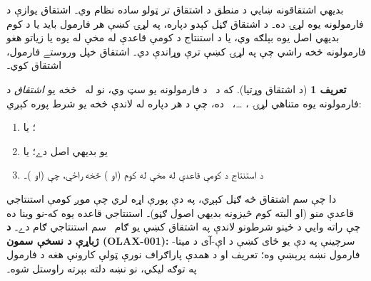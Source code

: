 \documentclass[12pt,a4paper,oneside]{report}
\newcommand{\olfileid}[3]{\gdef\pspart{#1}\gdef\pschapter{#2}\gdef\pssection{#3}}
\gdef\pspart{#2}\gdef\pschapter{#3}\gdef\pssection{}%
\theoremstyle{definition}
\newtheorem{defn}[thm]{تعريف}
\newenvironment{explain}{}{}
\begin{document}
\label{olpseg:OLP-0112-B008:start}
%


\label{olpseg:OLP-0112-B008:end}

\label{olpseg:OLP-0112-B010:start}
%


\label{olpseg:OLP-0112-B010:end}

\label{olpseg:OLP-0112-B013:start}
%


\label{olpseg:OLP-0112-B013:end}

\label{olpseg:OLP-0112-B016:start}
%


\label{olpseg:OLP-0112-B016:end}

\label{olpseg:OLP-0113-B004:start}
\olfileid{fol}{axd}{rul}
\label{olpseg:OLP-0113-B004:end}

\label{olpseg:OLP-0113-B005:start}
\label{olpseg:OLP-0113-B005:end}

\label{olpseg:OLP-0113-B006:start}
\begin{explain}
  بديهي اشتقاقونه ښايي د منطق د اشتقاق تر ټولو ساده
  نظام وي۔ اشتقاق يوازې د فارمولونه يوه لړۍ ده۔ د
  اشتقاق ګڼل کېدو دپاره، په لړۍ کښې هر فارمول بايد
  يا د کوم بديهي اصل يوه بېلګه وي، يا د استنتاج د کومې قاعدې له مخې
  له يوه يا زياتو هغو فارمولونه څخه راشي چې په لړۍ کښې ترې وړاندې
  دي۔ اشتقاق خپل وروستے فارمول، اشتقاق کوي۔
\end{explain}
\label{olpseg:OLP-0113-B006:end}

\label{olpseg:OLP-0113-B007:start}
\begin{defn}[د اشتقاق وړتيا]
که \LR{$\Gamma$} د~ د فارمولونه يو سټ وي، نو له~\LR{$\Gamma$}
څخه يو \emph{اشتقاق} د فارمولونه يوه متناهي لړۍ
، \dots،~ ده، چې د هر  دپاره له لاندې څخه
يو شرط پوره کېږي:
\begin{enumerate}
\item {}؛ يا
\item {} يو بديهي اصل دے؛ يا
\item {} د استنتاج د کومې قاعدې له مخې له کوم  (او
  ) څخه راځي، چې  (او )۔
\end{enumerate}
\end{defn}
\label{olpseg:OLP-0113-B007:end}

\label{olpseg:OLP-0113-B008:start}
دا چې سم اشتقاق څه ګڼل کېږي، په دې پورې اړه لري چې موږ
کومې استنتاجي قاعدې منو (او البته کوم څيزونه بديهي اصول ګڼو)۔
استنتاجي قاعده يوه که-نو وينا ده چې راته وايي د ځينو شرطونو لاندې
په اشتقاق کښې يو ګام~ سم استنتاجي ګام دے۔
\textbf{د ژباړې د نسخې سمون (OLAX-001):} سرچينې په دې يو ځای کښې
د اې-آی د ميتا-فارمول نښه پرېښې وه؛ تعريف او د همدې پاراګراف نورې
ټولې کارونې هغه د فارمول په توګه ليکي، نو نښه دلته بېرته راوستل شوه۔
\label{olpseg:OLP-0113-B008:end}
\end{document}
